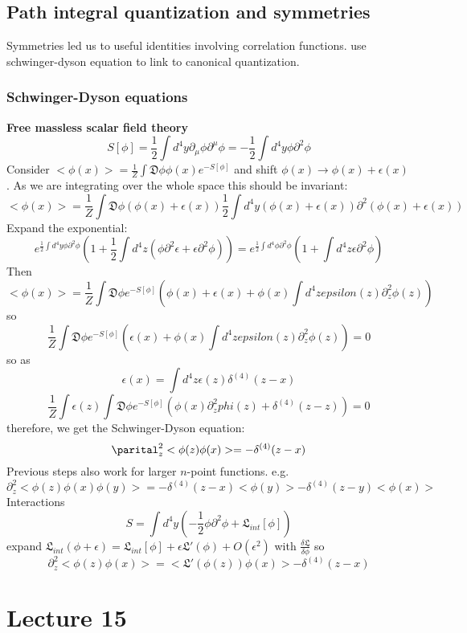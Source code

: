 \documentclass{article}
\begin{document}
\subsection{Path integral quantization and symmetries}
Symmetries led us to useful identities involving correlation functions. use schwinger-dyson equation to link to canonical quantization.
\subsubsection{Schwinger-Dyson equations}
\textbf{Free massless scalar field theory}
$$
 S[\phi] = \frac{1}{2} \int d^4 y \partial_{\mu} \phi \partial^{\mu} \phi = - \frac{1}{2} \int d^4 y \phi \partial^2 \phi
$$
Consider $< \phi(x)> = \frac{1}{Z} \int \mathfrak{D} \phi \phi(x) e^{-S[\phi]}$ and shift $\phi(x) \rightarrow \phi(x) + \epsilon(x)$. As we are integrating over the whole space this should be invariant:
$$
<\phi(x)> = \frac{1}{Z} \int \mathfrak{D} \phi ( \phi(x) + \epsilon(x)) \frac{1}{2} \int d^4 y ( \phi(x) + \epsilon(x)) \partial^2 ( \phi(x) + \epsilon(x))
$$
 Expand the exponential:
 $$
 e^{\frac{1}{2} \int d^4 y \phi  \partial^2 \phi} ( 1 + \frac{1}{2} \int d^4 z ( \phi \partial^2 \epsilon + \epsilon \partial^2 \phi))  = e^{\frac{1}{2} \int d^4 \phi \partial^2 \phi}( 1+ \int d^4 z \epsilon \partial^2 \phi)
 $$
 Then
 $$
  < \phi(x)> = \frac{1}{Z} \int \mathfrak{D} \phi e^{ - S[\phi]} ( \phi(x) + \epsilon(x) + \phi(x) \int d^4 z epsilon(z) \partial_z^2 \phi(z))
 $$
  so
  $$
\frac{1}{Z} \int \mathfrak{D} \phi e^{ - S[\phi]} (  \epsilon(x) + \phi(x) \int d^4 z epsilon(z) \partial_z^2 \phi(z)) = 0
  $$
  so as
  $$
   \epsilon(x) = \int d^4 z \epsilon(z) \delta^{(4)}(z-x)
  $$
  $$
  \frac{1}{Z} \int \epsilon(z) \int \mathfrak{D} \phi e^{ - S[\phi]} ( \phi(x) \partial_z^2 phi(z) +\delta^{(4)}(z-z)) = 0
  $$
  therefore, we get the Schwinger-Dyson equation:
  $$
   \parital_z^2 < \phi(z) \phi(x)> = - \delta^{(4)} (z-x)
  $$
  Previous steps also work for larger $n$-point functions. e.g.
  $$
   \partial^2_z < \phi(z) \phi(x) \phi( y)> = - \delta^{(4)} (z-x) < \phi(y)> - \delta^{(4)} (z-y) < \phi(x)>
  $$
  Interactions 
  $$
  S= \int d^4 y ( - \frac{1}{2} \phi \partial^2 \phi + \mathfrak{L}_{int} [\phi])
  $$
  expand $\mathfrak{L}_{int} ( \phi+ \epsilon) = \mathfrak{L}_{int} [\phi] + \epsilon \mathfrak{L}'( \phi) + O(\epsilon^2)$ with $\frac{\delta \mathfrak{L}}{\delta \phi}$ so
   $$
    \partial_z^2 < \phi(z) \phi(x) > = < \mathfrak{L}'(\phi(z)) \phi(x) > - \delta^{(4)} (z-x)
   $$
   \section{Lecture 15}
\end{document}
